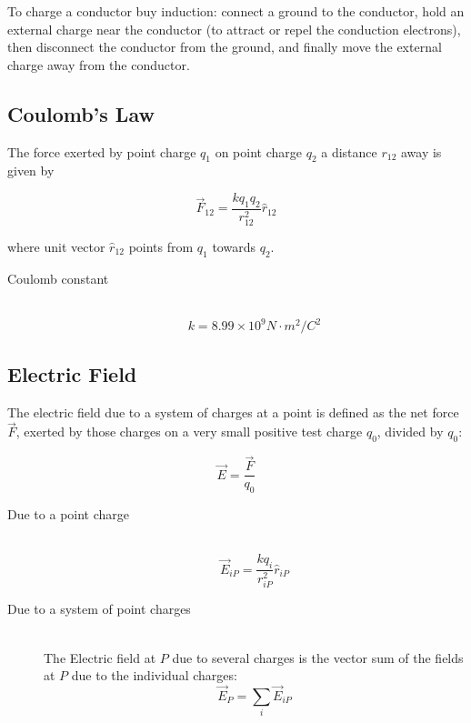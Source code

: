 \documentclass[../main.tex]{subfiles}
\begin{document}
To charge a conductor buy induction: connect a ground to the conductor,
hold an external charge near the conductor (to attract or repel the
conduction electrons), then disconnect the conductor from the ground,
and finally move the external charge away from the conductor.

\subsection{Coulomb's Law}\label{coulombs-law}

The force exerted by point charge \(q_1\) on point charge \(q_2\) a
distance \(r_{12}\) away is given by

\begin{equation}
  \vec{F}_{12} = \frac{kq_1q_2}{r_{12}^{2}}\hat{r}_{12}
\end{equation}

where unit vector \(\hat{r}_{12}\) points from \(q_1\) towards \(q_2\).
\begin{description}
  \item[Coulomb constant] \hfill \\
    \begin{equation}
      k = 8.99 \times10^9N\cdot m^2/C^2
    \end{equation}
\end{description}

\subsection{Electric Field}\label{electric-field}

The electric field due to a system of charges at a point is defined as
the net force \(\vec{F}\), exerted by those charges on a very small
positive test charge \(q_0\), divided by \(q_0\):

\begin{equation}
  \vec{E} = \frac{\vec{F}}{q_0}
\end{equation}

\begin{description}
  \item[Due to a point charge] \hfill \\
    \begin{equation}
      \vec{E}_{iP} = \frac{kq_i}{r_{iP}^{2}}\hat{r}_{iP}
    \end{equation}
  \item[Due to a system of point charges] \hfill \\
    The Electric field at \(P\) due to several charges is the vector sum of
    the fields at \(P\) due to the individual charges:
    \begin{equation}
      \vec{E}_P = \sum_{i}\vec{E}_{iP}
    \end{equation}
\end{description}
\end{document}
